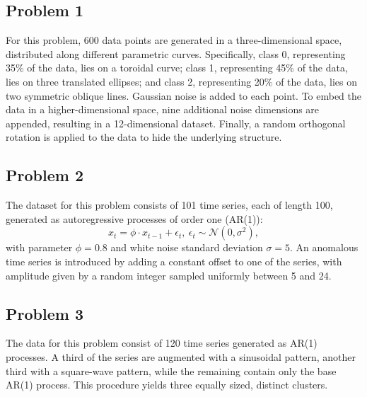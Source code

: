 \documentclass[prl,twocolumn]{revtex4-1}
\begin{document}
\subsection{Problem 1}
For this problem, 600 data points are generated in a three-dimensional space, distributed along different parametric curves.
Specifically, class 0, representing 35\% of the data, lies on a toroidal curve; class 1, representing 45\% of the data, lies on three translated ellipses; and class 2, representing 20\% of the data, lies on two symmetric oblique lines.
Gaussian noise is added to each point.
To embed the data in a higher-dimensional space, nine additional noise dimensions are appended, resulting in a 12-dimensional dataset.
Finally, a random orthogonal rotation is applied to the data to hide the underlying structure.

\subsection{Problem 2}
The dataset for this problem consists of 101 time series, each of length 100, generated as autoregressive processes of order one (AR(1)):
\begin{equation}
    x_t = \phi \cdot x_{t-1} + \epsilon_t, \ \epsilon_t \sim \mathcal{N}(0, \sigma ^2),
\end{equation}
with parameter $\phi = 0.8$ and white noise standard deviation $\sigma = 5$.
An anomalous time series is introduced by adding a constant offset to one of the series, with amplitude given by a random integer sampled uniformly between 5 and 24.

\subsection{Problem 3}
The data for this problem consist of 120 time series generated as AR(1) processes.
A third of the series are augmented with a sinusoidal pattern, another third with a square-wave pattern, while the remaining contain only the base AR(1) process.
This procedure yields three equally sized, distinct clusters.
    
\end{document}
